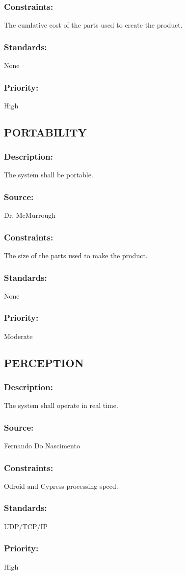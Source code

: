 \subsubsection{Constraints:} 
	{The cumlative cost of the parts used to create the product.}
\subsubsection{Standards:} 
	{None}
\subsubsection{Priority:} 
	{High}

\subsection{\text PORTABILITY}
\subsubsection{Description:} 
	{The system shall be portable.}
\subsubsection{Source:} 
	{Dr. McMurrough}
\subsubsection{Constraints:} 
	{The size of the parts used to make the product.}
\subsubsection{Standards:} 
	{None}
\subsubsection{Priority:} 
	{Moderate}

\subsection{\text PERCEPTION}
\subsubsection{Description:} 
	{The system shall operate in real time.}
\subsubsection{Source:} 
	{Fernando Do Nascimento}
\subsubsection{Constraints:} 
	{Odroid and Cypress processing speed.}
\subsubsection{Standards:} 
	{UDP/TCP/IP}
\subsubsection{Priority:} 
	{High}
